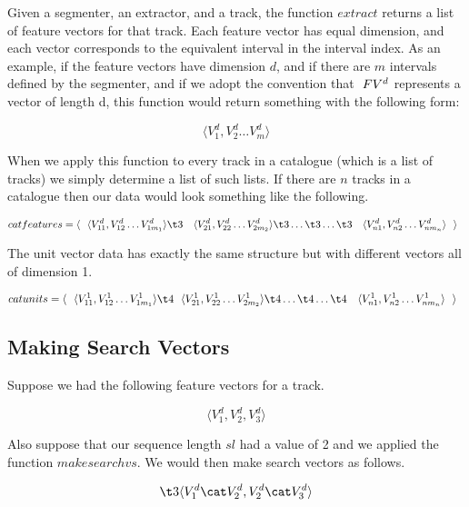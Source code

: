 \documentclass[11pt]{article}
\begin{document}
Given a segmenter, an extractor, and a track, the function $extract$ returns a list of feature vectors for that track. Each feature vector has equal dimension, and each vector corresponds to the equivalent interval in the interval index. As an example, if the feature vectors have dimension $d$, and if there are $m$ intervals defined by the segmenter, and if we adopt the convention that $\mathrel{~FV^{d}}$ represents a vector of length d, this function would return something with the following form: 

\[    \langle V_{1}^{d}, V_{2}^{d} \dots V_{m}^{d} \rangle \] 

When we apply this function to every track in a catalogue (which is a list of tracks) we simply determine a list of such lists. If there are $n$ tracks in a catalogue then our  data would look something like the following. 

\[ catfeatures = \langle ~~ \langle  V_{11}^{d}, V_{12}^{d} \dots V_{1m_{1}}^{d} \rangle \\
\t3 ~~~				      \langle  V_{21}^{d}, V_{22}^{d} \dots V_{2m_{2}}^{d} \rangle \\
\t3				      \dots \\
\t3				      \dots \\
\t3	~~~			      \langle  V_{n1}^{d}, V_{n2}^{d} \dots V_{nm_{n}}^{d} \rangle
      ~~  \rangle 
				    ~~  \]    
 
The unit vector data has exactly the same structure but with different vectors all of dimension 1. 

\[ catunits = \langle ~~ \langle  V_{11}^{1}, V_{12}^{1} \dots V_{1m_{1}}^{1} \rangle \\
\t4 ~~				      \langle  V_{21}^{1}, V_{22}^{1} \dots V_{2m_{2}}^{1} \rangle \\
\t4				      \dots \\
\t4				      \dots \\
\t4	~~~			      \langle  V_{n1}^{1}, V_{n2}^{1} \dots V_{nm_{n}}^{1} \rangle
      ~~  \rangle 
      				    ~~  \]    

\subsection{Making Search Vectors}

Suppose we had the following feature vectors for a track.

\[ \langle V_{1}^{d},  V_{2}^{d} , V_{3}^{d} \rangle \] 

Also suppose that our sequence length $sl$ had a value of 2 and we applied the function $makesearchvs$. We would then make search vectors as follows. 

\[  \t3 \langle  V_{1}^{d} \cat  V_{2}^{d} , V_{2}^{d} \cat V_{3}^{d}   \rangle  \] 
\end{document}
